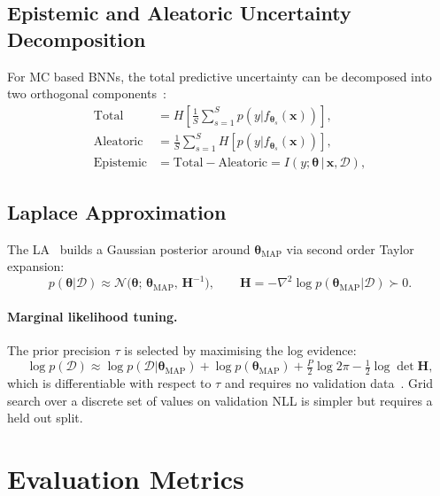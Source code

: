 \documentclass[conference]{IEEEtran}
\newcommand{\btheta}{\bm{\theta}}
\newcommand{\cD}{\mathcal{D}}
\newcommand{\cN}{\mathcal{N}}
\newcommand{\MAP}{\text{MAP}}
\begin{document}
\subsection{Epistemic and Aleatoric Uncertainty Decomposition}
\label{sec:theory:unc_decomp}

For MC based BNNs, the total predictive uncertainty can be decomposed into
two orthogonal components~\citep{goan2020bayesian}:
\begin{align}
	\text{Total}     & = H\!\left[\frac{1}{S}\sum_{s=1}^{S} p(y|f_{\btheta_s}(\bm{x}))\right], \\
	\text{Aleatoric} & = \frac{1}{S}\sum_{s=1}^{S} H\!\left[p(y|f_{\btheta_s}(\bm{x}))\right], \\
	\text{Epistemic} & = \text{Total} - \text{Aleatoric}
	= I\!\left(y;\btheta\,|\,\bm{x},\cD\right),
	\label{eq:mi}
\end{align}

\subsection{Laplace Approximation}
\label{sec:theory:la}

The LA~\citep{daxberger2021laplace} builds a Gaussian posterior around
$\btheta_{\MAP}$ via second order Taylor expansion:
\begin{equation}
	p(\btheta|\cD) \approx \cN\!\bigl(\btheta;\,\btheta_{\MAP},\,\mathbf{H}^{-1}\bigr),
	\qquad
	\mathbf{H} = -\nabla^2\log p(\btheta_{\MAP}|\cD) \succ 0.
\end{equation}

\paragraph{Marginal likelihood tuning.}
The prior precision $\tau$ is selected by maximising the log evidence:
\begin{equation}
	\log p(\cD)
	\approx \log p(\cD|\btheta_{\MAP})
	+ \log p(\btheta_{\MAP})
	+ \tfrac{P}{2}\log 2\pi
	- \tfrac{1}{2}\log\det\mathbf{H},
	\label{eq:marglik}
\end{equation}
which is differentiable with respect to $\tau$ and requires no validation
data~\citep{daxberger2021laplace}. Grid search over
a discrete set of values on validation NLL is simpler but requires a
held out split.

\section{Evaluation Metrics}
\label{sec:metrics}
\end{document}
